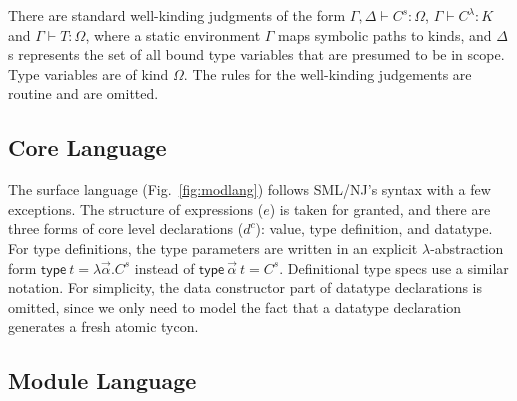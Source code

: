 \documentclass[9pt,nocopyrightspace, fleqn]{sigplanconf}
\begin{document}
There are standard well-kinding judgments of the form
$\Gamma,\Delta\vdash C^s : \Omega$, $\Gamma \vdash C^\lambda : K$ and
$\Gamma \vdash T : \Omega$, where a static environment $\Gamma$ maps
symbolic paths to kinds, and $\Delta$s represents the set of all bound
type variables that are presumed to be in scope. Type variables are of
kind $\Omega$. The rules for the well-kinding judgements are routine
and are omitted.



\subsection{Core Language}

The surface language (Fig.~\ref{fig:modlang}) follows SML/NJ's
syntax with a few exceptions. The structure of expressions ($e$) is
taken for granted, and there are three forms of core level
declarations ($d^c$): value, type definition, and datatype. For type
definitions, the type parameters are written in an explicit
$\lambda$-abstraction form $\mathsf{type}~t = \lambda\vec{\alpha}.C^s$
instead of $\mathsf{type}~\vec{\alpha}~t=C^s$. Definitional type specs
use a similar notation. For simplicity, the data constructor part of
datatype declarations is omitted, since we only need to model the fact
that a datatype declaration generates a fresh atomic tycon.





\subsection{Module Language}
\end{document}
